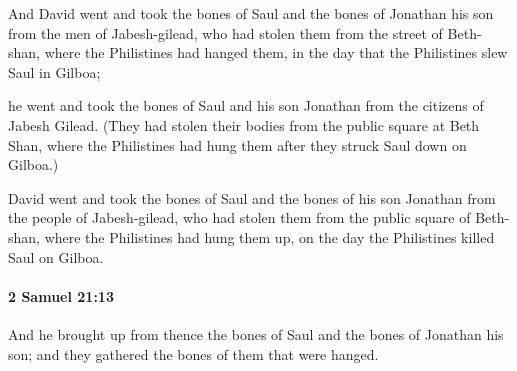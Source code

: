 			\begin{versebox}
					\item[BHS] 
					\item[ASV] And David went and took the bones of Saul and the bones of Jonathan his son from the men of Jabesh-gilead, who had stolen them from the street of Beth-shan, where the Philistines had hanged them, in the day that the Philistines slew Saul in Gilboa;
					\item[NIV] he went and took the bones of Saul and his son Jonathan from the citizens of Jabesh Gilead. (They had stolen their bodies from the public square at Beth Shan, where the Philistines had hung them after they struck Saul down on Gilboa.)
					\item[NRSV] David went and took the bones of Saul and the bones of his son Jonathan from the people of Jabesh-gilead, who had stolen them from the public square of Beth-shan, where the Philistines had hung them up, on the day the Philistines killed Saul on Gilboa.
			\end{versebox}

		\paragraph{2 Samuel 21:13} %
			\label{2SAMUEL-21-13}

			And he brought up from thence the bones of Saul and the bones of Jonathan his son; and they gathered the bones of them that were hanged.

